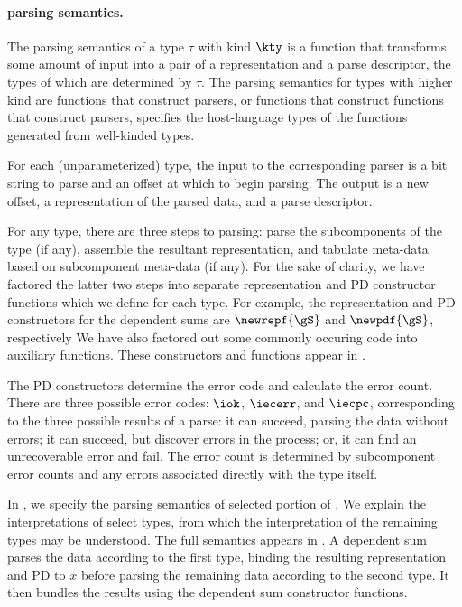 \paragraph*{\ddc{} parsing semantics.}
\label{sec:parse-sem}
The parsing semantics of a type $\tau$ with kind $\kty$ is a function that
transforms some amount of input into a pair of a representation and a
parse descriptor, the types of which are determined by $\tau$.  The
parsing semantics for types with higher kind are functions that
construct parsers, or functions that construct functions that
construct parsers, \etc{}  specifies
the host-language types of the functions generated from well-kinded
\ddc{} types.

For each (unparameterized) type, the input to the corresponding parser
is a bit string to parse and an offset at which to begin parsing.  
The output is a new offset,
a representation of the parsed data, and a parse descriptor.

For any type, there are three steps to parsing: parse the
subcomponents of the type (if any), assemble the resultant
representation, and tabulate meta-data based on subcomponent meta-data
(if any). For the sake of clarity, we have factored the latter two
steps into separate representation and PD constructor functions which
we define for each type. 
For example, the
representation and PD constructors for the dependent sums are
$\newrepf {\gS}$ and $\newpdf {\gS}$, 
respectively
We have also factored out some commonly
occuring code into auxiliary functions.  These constructors and functions
appear in .

The PD constructors determine the error code and calculate the error
count.  There are three possible error codes: $\iok$, $\iecerr$, and
$\iecpc$, corresponding to the three possible results of a parse: it
can succeed, parsing the data without errors; it can succeed, but
discover errors in the process; or, it can find an unrecoverable error
and fail.  The error count is determined by subcomponent error counts
and any errors associated directly with the type itself.

In , we specify the parsing semantics of
selected portion of \ddc{}. We explain the interpretations of select
types, from which the interpretation of the remaining types may be
understood. The full semantics appears in .
A dependent sum parses the data according to the first type, binding
the resulting representation and PD to $x$ before parsing the
remaining data according to the second type. It then bundles the
results using the dependent sum constructor functions.


